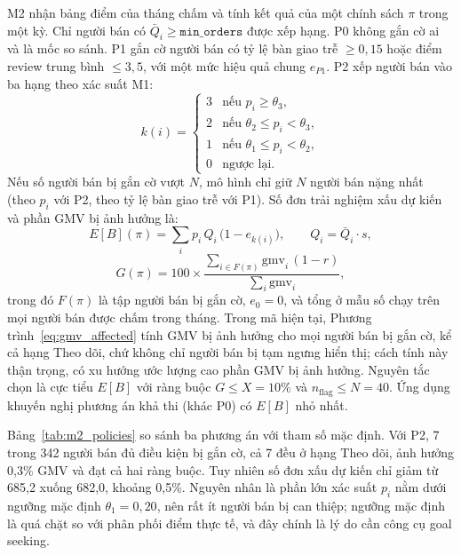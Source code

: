 \documentclass[a4paper]{article}
\begin{document}
M2 nhận bảng điểm của tháng chấm và tính kết quả của một chính sách $\pi$ trong một kỳ. Chỉ người bán có $\bar{Q}_i \ge \texttt{min\_orders}$ được xếp hạng. P0 không gắn cờ ai và là mốc so sánh. P1 gắn cờ người bán có tỷ lệ bàn giao trễ $\ge 0{,}15$ hoặc điểm review trung bình $\le 3{,}5$, với một mức hiệu quả chung $e_{P1}$. P2 xếp người bán vào ba hạng theo xác suất M1:
\begin{equation}
\label{eq:tier}
k(i) =
\begin{cases}
3 & \text{nếu } p_i \ge \theta_3,\\
2 & \text{nếu } \theta_2 \le p_i < \theta_3,\\
1 & \text{nếu } \theta_1 \le p_i < \theta_2,\\
0 & \text{ngược lại.}
\end{cases}
\end{equation}
Nếu số người bán bị gắn cờ vượt $N$, mô hình chỉ giữ $N$ người bán nặng nhất (theo $p_i$ với P2, theo tỷ lệ bàn giao trễ với P1). Số đơn trải nghiệm xấu dự kiến và phần GMV bị ảnh hưởng là:
\begin{equation}
\label{eq:expected_bad}
E[B](\pi) = \sum_{i} p_i \, Q_i \, \bigl(1 - e_{k(i)}\bigr), \qquad Q_i = \bar{Q}_i \cdot s,
\end{equation}
\begin{equation}
\label{eq:gmv_affected}
G(\pi) = 100 \times \frac{\sum_{i \in F(\pi)} \text{gmv}_i \, (1 - r)}{\sum_{i} \text{gmv}_i},
\end{equation}
trong đó $F(\pi)$ là tập người bán bị gắn cờ, $e_0 = 0$, và tổng ở mẫu số chạy trên mọi người bán được chấm trong tháng. Trong mã hiện tại, Phương trình~\eqref{eq:gmv_affected} tính GMV bị ảnh hưởng cho mọi người bán bị gắn cờ, kể cả hạng Theo dõi, chứ không chỉ người bán bị tạm ngưng hiển thị; cách tính này thận trọng, có xu hướng ước lượng cao phần GMV bị ảnh hưởng.
Nguyên tắc chọn là cực tiểu $E[B]$ với ràng buộc $G \le X = 10\%$ và $n_{\text{flag}} \le N = 40$. Ứng dụng khuyến nghị phương án khả thi (khác P0) có $E[B]$ nhỏ nhất.

Bảng~\ref{tab:m2_policies} so sánh ba phương án với tham số mặc định. Với P2, 7 trong 342 người bán đủ điều kiện bị gắn cờ, cả 7 đều ở hạng Theo dõi, ảnh hưởng 0,3\% GMV và đạt cả hai ràng buộc. Tuy nhiên số đơn xấu dự kiến chỉ giảm từ 685,2 xuống 682,0, khoảng 0,5\%. Nguyên nhân là phần lớn xác suất $p_i$ nằm dưới ngưỡng mặc định $\theta_1 = 0{,}20$, nên rất ít người bán bị can thiệp; ngưỡng mặc định là quá chặt so với phân phối điểm thực tế, và đây chính là lý do cần công cụ goal seeking.
\end{document}
